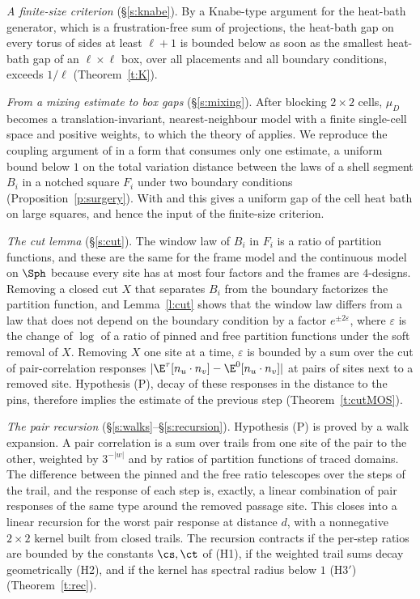 \emph{A finite-size criterion} (\S\ref{s:knabe}). By a Knabe-type argument for the heat-bath generator, which is a frustration-free sum of projections, the heat-bath gap on every torus of sides at least $\ell + 1$ is bounded below as soon as the smallest heat-bath gap of an $\ell \times \ell$ box, over all placements and all boundary conditions, exceeds $1/\ell$ (Theorem~\ref{t:K}).

\emph{From a mixing estimate to box gaps} (\S\ref{s:mixing}). After blocking $2 \times 2$ cells, $\mu_D$ becomes a translation-invariant, nearest-neighbour model with a finite single-cell space and positive weights, to which the theory of \cite{MOS94, MO94} applies. We reproduce the coupling argument of \cite[Proposition~2.1]{MOS94} in a form that consumes only one estimate, a uniform bound below $1$ on the total variation distance between the laws of a shell segment $B_i$ in a notched square $F_i$ under two boundary conditions (Proposition~\ref{p:surgery}). With \cite[Theorem~2.1]{MOS94} and \cite[Theorem~4.1]{MO94} this gives a uniform gap of the cell heat bath on large squares, and hence the input of the finite-size criterion.

\emph{The cut lemma} (\S\ref{s:cut}). The window law of $B_i$ in $F_i$ is a ratio of partition functions, and these are the same for the frame model and the continuous model on $\Sph$ because every site has at most four factors and the frames are $4$-designs. Removing a closed cut $X$ that separates $B_i$ from the boundary factorizes the partition function, and Lemma~\ref{l:cut} shows that the window law differs from a law that does not depend on the boundary condition by a factor $e^{\pm 2 \varepsilon}$, where $\varepsilon$ is the change of $\log$ of a ratio of pinned and free partition functions under the soft removal of $X$. Removing $X$ one site at a time, $\varepsilon$ is bounded by a sum over the cut of pair-correlation responses $|\E^\tau[n_u \cdot n_v] - \E^0[n_u \cdot n_v]|$ at pairs of sites next to a removed site. Hypothesis (P), decay of these responses in the distance to the pins, therefore implies the estimate of the previous step (Theorem~\ref{t:cutMOS}).

\emph{The pair recursion} (\S\ref{s:walks}--\S\ref{s:recursion}). Hypothesis (P) is proved by a walk expansion. A pair correlation is a sum over trails from one site of the pair to the other, weighted by $3^{-|w|}$ and by ratios of partition functions of traced domains. The difference between the pinned and the free ratio telescopes over the steps of the trail, and the response of each step is, exactly, a linear combination of pair responses of the same type around the removed passage site. This closes into a linear recursion for the worst pair response at distance $d$, with a nonnegative $2 \times 2$ kernel built from closed trails. The recursion contracts if the per-step ratios are bounded by the constants $\cs, \ct$ of (H1), if the weighted trail sums decay geometrically (H2), and if the kernel has spectral radius below $1$ (H3$'$) (Theorem~\ref{t:rec}).

